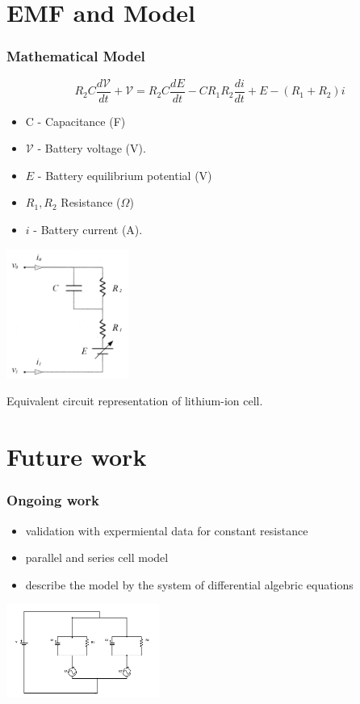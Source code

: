 \documentclass{beamer}
\begin{document}
\section{EMF and Model}
\begin{frame}
\frametitle{Mathematical Model}
\[ R_2 C \frac{d \mathcal{V}}{d t} + \mathcal{V} = R_2 C \frac{d E}{d t} - C R_1 R_2 \frac{d i}{d t} + E -(R_1 + R_2) i \]
\centering

\begin{minipage}{.5\textwidth}
\centering
\begin{itemize}
\item C - Capacitance (F)
\item $\mathcal{V}$ - Battery voltage (V).
  \item $E$ - Battery equilibrium potential (V)
  \item $R_1, R_2$ Resistance ($\Omega$)
  \item $i$ - Battery current (A).
\end{itemize}
      
\end{minipage}%
\begin{minipage}{0.5\textwidth}
\includegraphics[width=4cm]{circuit.png}\\
\centering
\caption{Equivalent circuit representation of lithium-ion cell.}
\end{minipage}
\end{frame}
\section{Future work}
\begin{frame}
  \frametitle{Ongoing work}
\begin{itemize}
\item validation with expermiental data for constant resistance 
\item parallel and series cell model
  \item describe the model by the system of differential algebric equations 
\end{itemize}
\centerline{\includegraphics[width=5cm]{TheCircuit}}
\end{frame}
\end{document}
